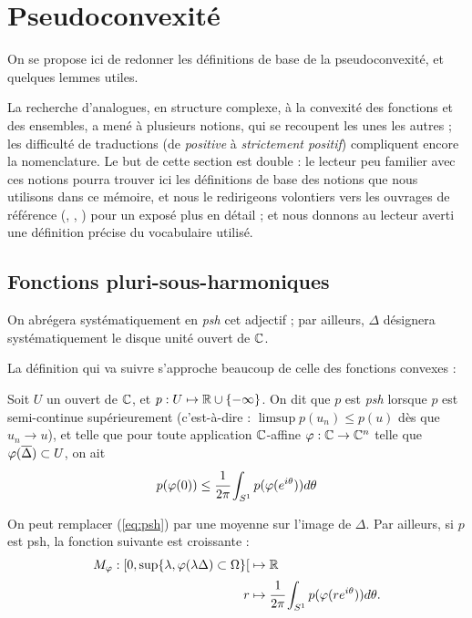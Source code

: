 \section{Pseudoconvexité}

On se propose ici de redonner les définitions de base de la pseudoconvexité, et quelques lemmes utiles.

La recherche d'analogues, en structure complexe, à la convexité des fonctions et des ensembles, a mené à plusieurs notions, qui se recoupent les unes les autres ; les difficulté de traductions (de \emph{positive} à \emph{strictement positif}) compliquent encore la nomenclature. Le but de cette section est double : le lecteur peu familier avec ces notions pourra trouver ici les définitions de base des notions que nous utilisons dans ce mémoire, et nous le redirigeons volontiers vers les ouvrages de référence (\cite{krantz1992partial}, \cite{voisin2002theorie}, \cite{demailly1997complex}) pour un exposé plus en détail ; et nous donnons au lecteur averti une définition précise du vocabulaire utilisé.

\subsection{Fonctions pluri-sous-harmoniques}
On abrégera systématiquement en \emph{psh} cet adjectif ; par ailleurs, $\Delta$ désignera systématiquement le disque unité ouvert de $\mathbb{C}$.

La définition qui va suivre s'approche beaucoup de celle des fonctions convexes :
\begin{defn}
	Soit $U$ un ouvert de $\mathbb{C}$, et $p:U\mapsto \mathbb{R} \cup \{-\infty \}$. On dit que $p$ est \emph{psh} lorsque $p$ est semi-continue supérieurement (c'est-à-dire : $\limsup p(u_n) \leq p(u)$ dès que $u_n \to u$), et telle que pour toute application $\mathbb{C}$-affine $\varphi : \mathbb{C} \to \mathbb{C}^n$ telle que $\varphi(\overline{\Delta}) \subset U$, on ait 
	\begin{equation}
		\label{eq:psh}
		p(\varphi(0)) \leq \cfrac{1}{2\pi}\int_{S^1}p(\varphi(e^{i\theta}))d\theta
	\end{equation}
\end{defn}
\begin{rem}
	On peut remplacer (\ref{eq:psh}) par une moyenne sur l'image de $\Delta$. Par ailleurs, si $p$ est psh, la fonction suivante est croissante :
	\begin{align*}
		M_{\varphi} : [0,\sup\{\lambda,\varphi(\lambda\Delta)\subset \Omega\}[ &\mapsto \mathbb{R}\\
		r &\mapsto \cfrac{1}{2\pi}\int_{S^1}p(\varphi(re^{i\theta}))d\theta.
	\end{align*}
\end{rem}

